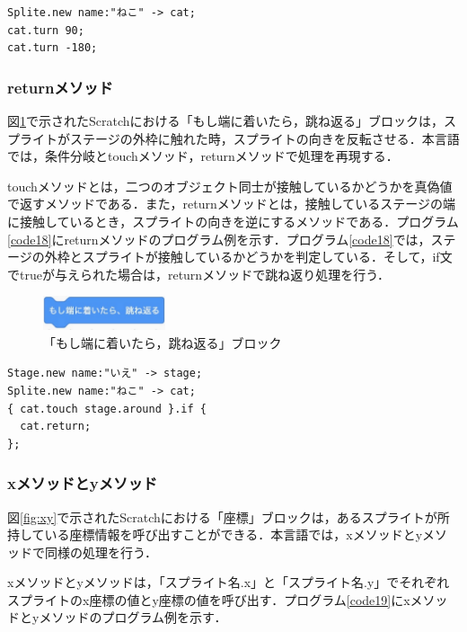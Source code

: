 \documentclass[10pt,a4j]{ltjsarticle}
\begin{document}
\begin{lstlisting}[caption=turnメソッドのプログラム例, label=code17]
Splite.new name:"ねこ" -> cat;
cat.turn 90;
cat.turn -180; 
\end{lstlisting}

\subsubsection{returnメソッド}
図\ref{fig:return}で示されたScratchにおける「もし端に着いたら，跳ね返る」ブロックは，スプライトがステージの外枠に触れた時，スプライトの向きを反転させる．本言語では，条件分岐とtouchメソッド，returnメソッドで処理を再現する．

touchメソッドとは，二つのオブジェクト同士が接触しているかどうかを真偽値で返すメソッドである．また，returnメソッドとは，接触しているステージの端に接触しているとき，スプライトの向きを逆にするメソッドである．プログラム\ref{code18}にreturnメソッドのプログラム例を示す．プログラム\ref{code18}では，ステージの外枠とスプライトが接触しているかどうかを判定している．そして，if文でtrueが与えられた場合は，returnメソッドで跳ね返り処理を行う．

\begin{figure}[H]
  \centering
  \includegraphics[height=10mm]{images/return.pdf}
  \caption{「もし端に着いたら，跳ね返る」ブロック}
  \label{fig:return}
\end{figure}

\begin{lstlisting}[caption=returnメソッドのプログラム例, label=code18]
Stage.new name:"いえ" -> stage;
Splite.new name:"ねこ" -> cat;
{ cat.touch stage.around }.if {
  cat.return;
};
\end{lstlisting}

\subsubsection{xメソッドとyメソッド}
図\ref{fig:xy}で示されたScratchにおける「座標」ブロックは，あるスプライトが所持している座標情報を呼び出すことができる．本言語では，xメソッドとyメソッドで同様の処理を行う．

xメソッドとyメソッドは，「スプライト名.x」と「スプライト名.y」でそれぞれスプライトのx座標の値とy座標の値を呼び出す．プログラム\ref{code19}にxメソッドとyメソッドのプログラム例を示す．
\end{document}
